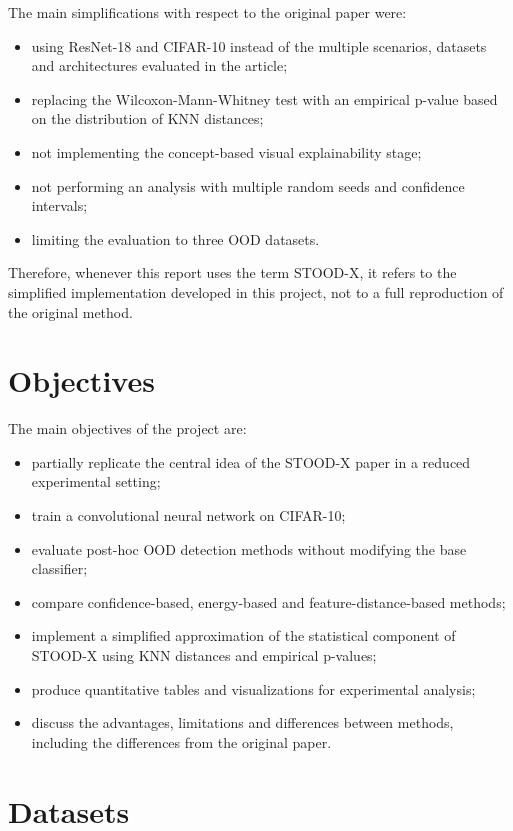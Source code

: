 \documentclass[11pt,a4paper]{article}
\begin{document}
The main simplifications with respect to the original paper were:

\begin{itemize}
    \item using ResNet-18 and CIFAR-10 instead of the multiple scenarios, datasets and architectures evaluated in the article;
    \item replacing the Wilcoxon-Mann-Whitney test with an empirical p-value based on the distribution of KNN distances;
    \item not implementing the concept-based visual explainability stage;
    \item not performing an analysis with multiple random seeds and confidence intervals;
    \item limiting the evaluation to three OOD datasets.
\end{itemize}

Therefore, whenever this report uses the term STOOD-X, it refers to the simplified implementation developed in this project, not to a full reproduction of the original method.

\section{Objectives}

The main objectives of the project are:

\begin{itemize}
    \item partially replicate the central idea of the STOOD-X paper in a reduced experimental setting;
    \item train a convolutional neural network on CIFAR-10;
    \item evaluate post-hoc OOD detection methods without modifying the base classifier;
    \item compare confidence-based, energy-based and feature-distance-based methods;
    \item implement a simplified approximation of the statistical component of STOOD-X using KNN distances and empirical p-values;
    \item produce quantitative tables and visualizations for experimental analysis;
    \item discuss the advantages, limitations and differences between methods, including the differences from the original paper.
\end{itemize}

\section{Datasets}
\end{document}

